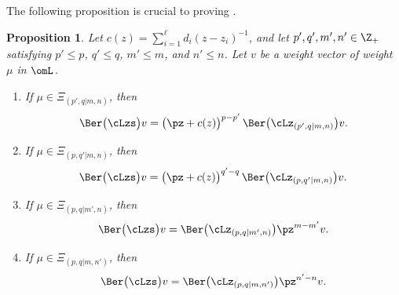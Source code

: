 \documentclass[11pt, reqno]{amsart}
\newtheorem{prop}[thm]{Proposition}
\theoremstyle{definition}
\theoremstyle{remark}
\numberwithin{equation}{section}
\begin{document}
The following proposition is crucial to proving .

\begin{prop} \label{trunc}
Let $c(z)=\sum_{i=1}^\ell d_i (z-z_i)^{-1}$, and let $p', q', m', n' \in \Z_+$ satisfying $p' \le p$, $q' \le q$, $m' \le m$, and $n' \le n$.
Let $v$ be a weight vector of weight $\mu$ in $\omL$.

\begin{enumerate} [\normalfont(i)]

\item   If $\mu \in \Xi_{(p',q|m,n)}$, then
$$
\Ber \big(\cLzs\big) v= \big(\pz+c(z) \big)^{p-p'} \, \Ber \big(\cLz_{(p',q|m,n)} \big)  v.
$$

\item If  $\mu \in \Xi_{(p,q'|m,n)}$, then
$$
\Ber \big(\cLzs\big) v=  \big(\pz+c(z) \big)^{q'-q} \, \Ber \big(\cLz_{(p,q'|m,n)} \big)  v.
$$

\item If  $\mu \in \Xi_{(p,q|m',n)}$, then
$$
\Ber \big(\cLzs\big) v=  \Ber \big(\cLz_{(p,q|m',n)} \big) \pz^{m-m'} v.
$$

\item If  $\mu \in \Xi_{(p,q|m,n')}$, then
$$
\Ber \big(\cLzs\big) v=   \Ber \big(\cLz_{(p,q|m,n')} \big) \pz^{n'-n} v.
$$

\end{enumerate}

\end{prop}
\end{document}
